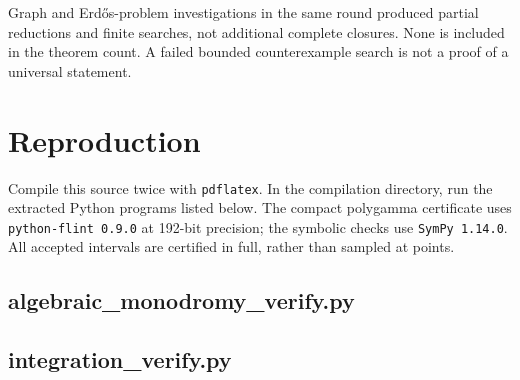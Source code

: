 Graph and Erd\H{o}s-problem investigations in the same round produced
partial reductions and finite searches, not additional complete
closures. None is included in the theorem count. A failed bounded
counterexample search is not a proof of a universal statement.

\appendix
\section{Reproduction}
Compile this source twice with \texttt{pdflatex}. In the compilation
directory, run the extracted Python programs listed below. The compact
polygamma certificate uses \texttt{python-flint 0.9.0} at 192-bit
precision; the symbolic checks use \texttt{SymPy 1.14.0}. All accepted
intervals are certified in full, rather than sampled at points.
\subsection*{algebraic\_monodromy\_verify.py}

\subsection*{integration\_verify.py}

